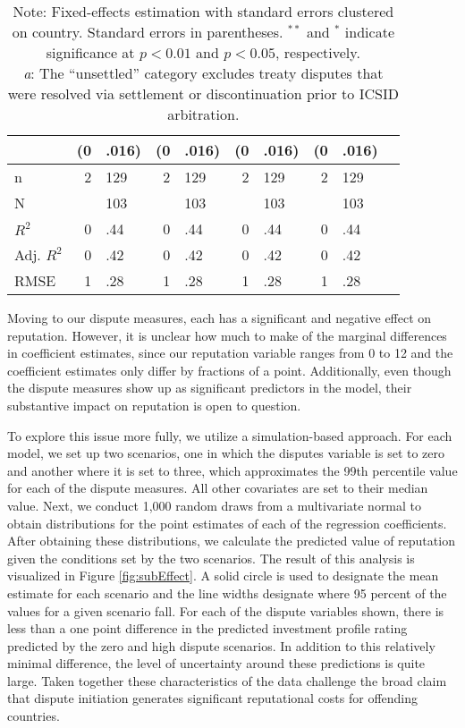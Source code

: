 \documentclass[12pt,onesided]{amsart}
\begin{document}
\begin{savenotes}
\begin{table}[ht]
\begin{tabular}{lr@{} lr@{}lr@{}lr@{}lr@{}}
   & (0&.016) & (0&.016) & (0&.016) & (0&.016) \\ 
   \hline
  n & 2&129 & 2&129 & 2&129 & 2&129 \\ 
  N && 103 && 103 && 103 && 103 \\ 
  $R^{2}$ & 0&.44 & 0&.44 & 0&.44 & 0&.44 \\ 
  Adj. $R^{2}$ & 0&.42 & 0&.42 & 0&.42 & 0&.42 \\ 
  RMSE & 1&.28 & 1&.28 & 1&.28 & 1&.28 \\ 
   \hline\hline
\end{tabular}
\caption*{Note: Fixed-effects estimation with standard errors clustered on country. Standard errors in parentheses. $^{**}$ and $^{*}$ indicate significance at $p<0.01$ and $p<0.05$, respectively. \\ \textit{a}: The ``unsettled'' category excludes treaty disputes that were resolved via settlement or discontinuation prior to ICSID arbitration.}
\end{table}
\end{savenotes}


Moving to our dispute measures, each has a significant and negative effect on reputation. However, it is unclear how much to make of the marginal differences in coefficient estimates, since our reputation variable ranges from 0 to 12 and the coefficient estimates only differ by fractions of a point. Additionally, even though the dispute measures show up as significant predictors in the model, their substantive impact on reputation is open to question. 

To explore this issue more fully, we utilize a simulation-based approach. For each model, we set up two scenarios, one in which the disputes variable is set to zero and another where it is set to three, which approximates the 99th percentile value for each of the dispute measures. All other covariates are set to their median value. Next, we conduct 1,000 random draws from a multivariate normal to obtain distributions for the point estimates of each of the regression coefficients. After obtaining these distributions, we calculate the predicted value of reputation given the conditions set by the two scenarios. The result of this analysis is visualized in Figure \ref{fig:subEffect}. A solid circle is used to designate the mean estimate for each scenario and the line widths designate where 95 percent of the values for a given scenario fall. For each of the dispute variables shown, there is less than a one point difference in the predicted investment profile rating predicted by the zero and high dispute scenarios. In addition to this relatively minimal difference, the level of uncertainty around these predictions is quite large. Taken together these characteristics of the data challenge the broad claim that dispute initiation generates significant reputational costs for offending countries.
\end{document}
